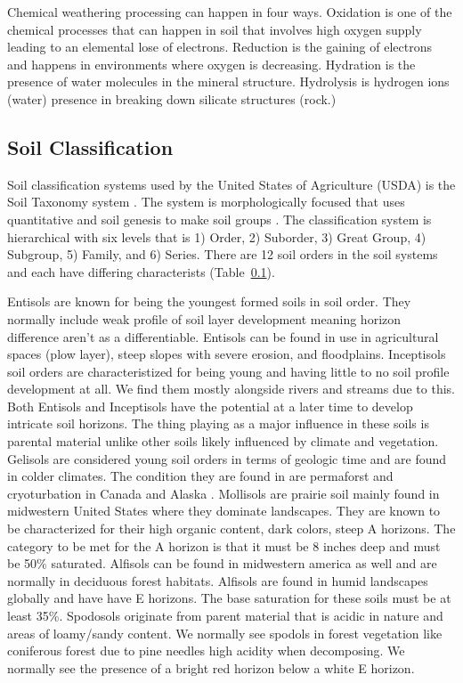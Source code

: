 Chemical weathering processing can happen in four ways. Oxidation is one of the chemical processes that can happen in soil that involves high oxygen supply leading to an elemental lose of electrons. Reduction is the gaining of electrons and happens in environments where oxygen is decreasing. Hydration is the presence of water molecules in the mineral structure. Hydrolysis is hydrogen ions (water) presence in breaking down silicate structures (rock.)
 

\subsection {Soil Classification}


Soil classification systems used by the United States of Agriculture (USDA) is the  Soil Taxonomy system \citep{soil2003keys}. The system is morphologically focused that uses quantitative and soil genesis to make soil groups \citep{buol1999oxisols}. The classification system is hierarchical with six levels that is 1) Order, 2) Suborder, 3) Great Group, 4) Subgroup, 5) Family, and 6) Series. There are 12 soil orders in the soil systems and each have differing characterists (Table~\ref{}). 

Entisols are known for being the youngest formed soils in soil order. They normally include weak profile of soil layer development meaning horizon difference  aren't as a differentiable. Entisols can be found in use in agricultural spaces (plow layer), steep slopes with severe erosion, and  floodplains.  Inceptisols soil orders are characteristized for being young and having little to no soil profile development at all. We find them mostly alongside rivers and streams due to this.  Both Entisols and Inceptisols have the potential at a later time to develop intricate soil horizons. The thing playing as a major influence in these soils is parental material unlike other soils likely influenced by climate and vegetation. Gelisols are considered young soil orders in terms of geologic time and are found in colder climates. The condition they are found in are permaforst and cryoturbation in Canada and Alaska \citep{soil2003keys}. Mollisols are prairie soil mainly found in midwestern United States where they dominate landscapes. They are known to be characterized for their high organic content, dark colors, steep A horizons. The category to be met for the A horizon is that it must be 8 inches deep and must be 50\% saturated. Alfisols can be found in midwestern america as well and are normally in deciduous forest habitats. Alfisols are found in humid landscapes globally and have have E horizons.  The base saturation for these soils must be at least 35\%. Spodosols originate from parent material that is acidic in nature and areas of loamy/sandy content. We normally see spodols in forest vegetation like coniferous forest due to pine needles high acidity when decomposing. \citep{brady2007colloidal} We normally see the presence of a bright red horizon below a white E horizon.


